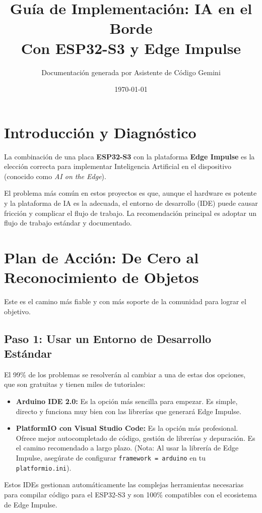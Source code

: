 \documentclass[12pt, a4paper]{article}
\title{\textbf{Guía de Implementación: IA en el Borde}\\ \large Con ESP32-S3 y Edge Impulse}
\author{Documentación generada por Asistente de Código Gemini}
\date{\today}
\begin{document}
\maketitle
\tableofcontents
\newpage

\section{Introducción y Diagnóstico}

La combinación de una placa \textbf{ESP32-S3} con la plataforma \textbf{Edge Impulse} es la elección correcta para implementar Inteligencia Artificial en el dispositivo (conocido como \textit{AI on the Edge}).

El problema más común en estos proyectos es que, aunque el hardware es potente y la plataforma de IA es la adecuada, el entorno de desarrollo (IDE) puede causar fricción y complicar el flujo de trabajo. La recomendación principal es adoptar un flujo de trabajo estándar y documentado.

\section{Plan de Acción: De Cero al Reconocimiento de Objetos}

Este es el camino más fiable y con más soporte de la comunidad para lograr el objetivo.

\subsection{Paso 1: Usar un Entorno de Desarrollo Estándar}
El 99\% de los problemas se resolverán al cambiar a una de estas dos opciones, que son gratuitas y tienen miles de tutoriales:
\begin{itemize}
    \item \textbf{Arduino IDE 2.0:} Es la opción más sencilla para empezar. Es simple, directo y funciona muy bien con las librerías que generará Edge Impulse.
    \item \textbf{PlatformIO con Visual Studio Code:} Es la opción más profesional. Ofrece mejor autocompletado de código, gestión de librerías y depuración. Es el camino recomendado a largo plazo. (Nota: Al usar la librería de Edge Impulse, asegúrate de configurar \texttt{framework = arduino} en tu \texttt{platformio.ini}).
\end{itemize}
Estos IDEs gestionan automáticamente las complejas herramientas necesarias para compilar código para el ESP32-S3 y son 100\% compatibles con el ecosistema de Edge Impulse.
\end{document}
